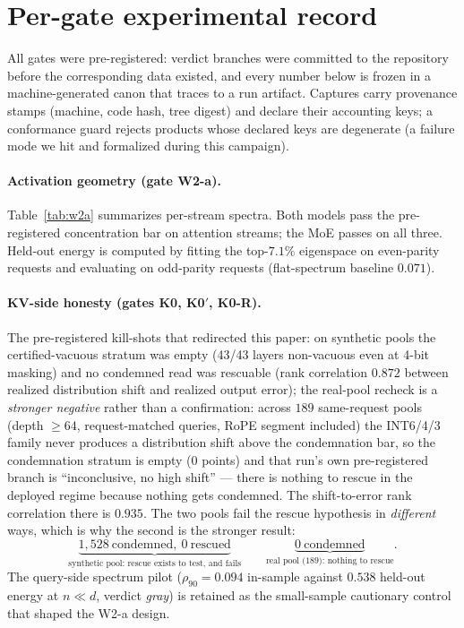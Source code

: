 \documentclass[11pt]{article}
\renewcommand{\_}{\WCorigunderscore\allowbreak}
\begin{document}
\appendix
\section{Per-gate experimental record}
\label{app:exp}
\label{sec:exp}
All gates were pre-registered: verdict branches were committed to the
repository before the corresponding data existed, and every number
below is frozen in a machine-generated canon that traces to a run
artifact. Captures carry provenance stamps (machine, code hash, tree
digest) and declare their accounting keys; a conformance guard rejects
products whose declared keys are degenerate (a failure mode we hit and
formalized during this campaign).

\paragraph{Activation geometry (gate W2-a).}
Table~\ref{tab:w2a} summarizes per-stream spectra. Both models pass the
pre-registered concentration bar on attention streams; the MoE passes
on all three. Held-out energy is computed by fitting the top-$7.1\%$
eigenspace on even-parity requests and evaluating on odd-parity
requests (flat-spectrum baseline $0.071$).




\paragraph{KV-side honesty (gates K0, K0$'$, K0-R).}
The pre-registered kill-shots that redirected this paper: on synthetic
pools the certified-vacuous stratum was empty (43/43 layers
non-vacuous even at 4-bit masking) and no condemned read was rescuable
(rank correlation $0.872$ between realized distribution shift and
realized output error); the real-pool recheck is a
\emph{stronger negative} rather than a confirmation: across $189$
same-request pools (depth $\geq 64$, request-matched queries, RoPE
segment included) the INT6/4/3 family never produces a distribution
shift above the condemnation bar, so the condemnation stratum is empty
($0$ points) and that run's own pre-registered branch is
``inconclusive, no high shift'' --- there is nothing to rescue in the
deployed regime because nothing gets condemned. The shift-to-error rank
correlation there is $0.935$. The two pools fail the rescue hypothesis
in \emph{different} ways, which is why the second is the stronger
result:
\begin{equation}
\underbrace{1{,}528\ \text{condemned},\ 0\ \text{rescued}}
      _{\text{synthetic pool: rescue exists to test, and fails}}
\qquad
\underbrace{0\ \text{condemned}}
      _{\text{real pool ($189$): nothing to rescue}} .
\label{eq:twopools}
\end{equation}
The query-side spectrum pilot
($\rho_{90}=0.094$ in-sample against $0.538$ held-out energy at
$n\ll d$, verdict \emph{gray}) is retained as the small-sample
cautionary control that shaped the W2-a design.
\end{document}
